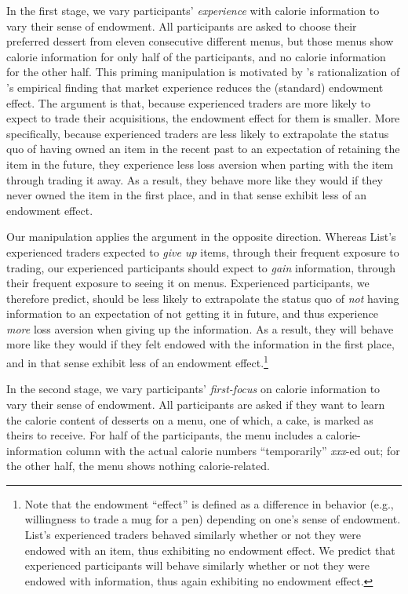 In the first stage, we vary participants’ \emph{experience} with calorie information to vary their sense of endowment. All participants are asked to choose their preferred dessert from eleven consecutive different menus, but those menus show calorie information for only half of the participants, and no calorie information for the other half. This priming manipulation is motivated by \citet{koszegiModelReferenceDependentPreferences2006}'s rationalization of \citet{listDoesMarketExperience2003}'s empirical finding that market experience reduces the (standard) endowment effect. The argument is that, because experienced traders are more likely to expect to trade their acquisitions, the endowment effect for them is smaller. More specifically, because experienced traders are less likely to extrapolate the status quo of having owned an item in the recent past to an expectation of retaining the item in the future, they experience less loss aversion when parting with the item through trading it away. As a result, they behave more like they would if they never owned the item in the first place, and in that sense exhibit less of an endowment effect.


Our manipulation applies the argument in the opposite direction. Whereas List’s experienced traders expected to \emph{give up} items, through their frequent exposure to trading, our experienced participants should expect to \emph{gain} information, through their frequent exposure to seeing it on menus. Experienced participants, we therefore predict, should be less likely to extrapolate the status quo of \emph{not} having information to an expectation of not getting it in future, and thus experience \emph{more} loss aversion when giving up the information. As a result, they will behave more like they would if they felt endowed with the information in the first place, and in that sense exhibit less of an endowment effect.\footnote{Note that the endowment \enquote{effect} is defined as a difference in behavior (e.g., willingness to trade a mug for a pen) depending on one’s sense of endowment. List’s experienced traders behaved similarly whether or not they were endowed with an item, thus exhibiting no endowment effect. We predict that experienced participants will behave similarly whether or not they were endowed with information, thus again exhibiting no endowment effect.}

In the second stage, we vary participants' \emph{first-focus} on calorie information to vary their sense of endowment. All participants are asked if they want to learn the calorie content of desserts on a menu, one of which, a cake, is marked as theirs to receive. For half of the participants, the menu includes a calorie-information column with the actual calorie numbers \enquote{temporarily} \emph{xxx}-ed out; for the other half, the menu shows nothing calorie-related.

